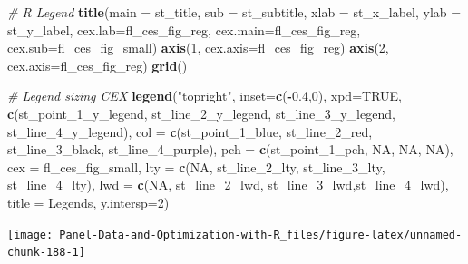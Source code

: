 \documentclass[
]{book}
\newenvironment{Shaded}{\begin{snugshade}}{\end{snugshade}}
\newcommand{\CommentTok}[1]{\textcolor[rgb]{0.56,0.35,0.01}{\textit{#1}}}
\newcommand{\DataTypeTok}[1]{\textcolor[rgb]{0.13,0.29,0.53}{#1}}
\newcommand{\DecValTok}[1]{\textcolor[rgb]{0.00,0.00,0.81}{#1}}
\newcommand{\FloatTok}[1]{\textcolor[rgb]{0.00,0.00,0.81}{#1}}
\newcommand{\KeywordTok}[1]{\textcolor[rgb]{0.13,0.29,0.53}{\textbf{#1}}}
\newcommand{\NormalTok}[1]{#1}
\newcommand{\OperatorTok}[1]{\textcolor[rgb]{0.81,0.36,0.00}{\textbf{#1}}}
\newcommand{\OtherTok}[1]{\textcolor[rgb]{0.56,0.35,0.01}{#1}}
\newcommand{\StringTok}[1]{\textcolor[rgb]{0.31,0.60,0.02}{#1}}
\begin{document}
\begin{Shaded}
\begin{Highlighting}[]
\CommentTok{\# R Legend}
\KeywordTok{title}\NormalTok{(}\DataTypeTok{main =}\NormalTok{ st\_title, }\DataTypeTok{sub =}\NormalTok{ st\_subtitle, }\DataTypeTok{xlab =}\NormalTok{ st\_x\_label, }\DataTypeTok{ylab =}\NormalTok{ st\_y\_label,}
      \DataTypeTok{cex.lab=}\NormalTok{fl\_ces\_fig\_reg,}
      \DataTypeTok{cex.main=}\NormalTok{fl\_ces\_fig\_reg,}
      \DataTypeTok{cex.sub=}\NormalTok{fl\_ces\_fig\_small)}
\KeywordTok{axis}\NormalTok{(}\DecValTok{1}\NormalTok{, }\DataTypeTok{cex.axis=}\NormalTok{fl\_ces\_fig\_reg)}
\KeywordTok{axis}\NormalTok{(}\DecValTok{2}\NormalTok{, }\DataTypeTok{cex.axis=}\NormalTok{fl\_ces\_fig\_reg)}
\KeywordTok{grid}\NormalTok{()}

\CommentTok{\# Legend sizing CEX}
\KeywordTok{legend}\NormalTok{(}\StringTok{"topright"}\NormalTok{,}
       \DataTypeTok{inset=}\KeywordTok{c}\NormalTok{(}\OperatorTok{{-}}\FloatTok{0.4}\NormalTok{,}\DecValTok{0}\NormalTok{),}
       \DataTypeTok{xpd=}\OtherTok{TRUE}\NormalTok{,}
       \KeywordTok{c}\NormalTok{(st\_point\_}\DecValTok{1}\NormalTok{\_y\_legend, st\_line\_}\DecValTok{2}\NormalTok{\_y\_legend, st\_line\_}\DecValTok{3}\NormalTok{\_y\_legend, st\_line\_}\DecValTok{4}\NormalTok{\_y\_legend),}
       \DataTypeTok{col =} \KeywordTok{c}\NormalTok{(st\_point\_}\DecValTok{1}\NormalTok{\_blue, st\_line\_}\DecValTok{2}\NormalTok{\_red, st\_line\_}\DecValTok{3}\NormalTok{\_black, st\_line\_}\DecValTok{4}\NormalTok{\_purple),}
       \DataTypeTok{pch =} \KeywordTok{c}\NormalTok{(st\_point\_}\DecValTok{1}\NormalTok{\_pch, }\OtherTok{NA}\NormalTok{, }\OtherTok{NA}\NormalTok{, }\OtherTok{NA}\NormalTok{),}
       \DataTypeTok{cex =}\NormalTok{ fl\_ces\_fig\_small,}
       \DataTypeTok{lty =} \KeywordTok{c}\NormalTok{(}\OtherTok{NA}\NormalTok{, st\_line\_}\DecValTok{2}\NormalTok{\_lty, st\_line\_}\DecValTok{3}\NormalTok{\_lty, st\_line\_}\DecValTok{4}\NormalTok{\_lty),}
       \DataTypeTok{lwd =} \KeywordTok{c}\NormalTok{(}\OtherTok{NA}\NormalTok{, st\_line\_}\DecValTok{2}\NormalTok{\_lwd, st\_line\_}\DecValTok{3}\NormalTok{\_lwd,st\_line\_}\DecValTok{4}\NormalTok{\_lwd),}
       \DataTypeTok{title =} \StringTok{\textquotesingle{}Legends\textquotesingle{}}\NormalTok{,}
       \DataTypeTok{y.intersp=}\DecValTok{2}\NormalTok{)}
\end{Highlighting}
\end{Shaded}

\begin{center}\texttt{[image: Panel-Data-and-Optimization-with-R\_files/figure-latex/unnamed-chunk-188-1]} \end{center}
\end{document}
